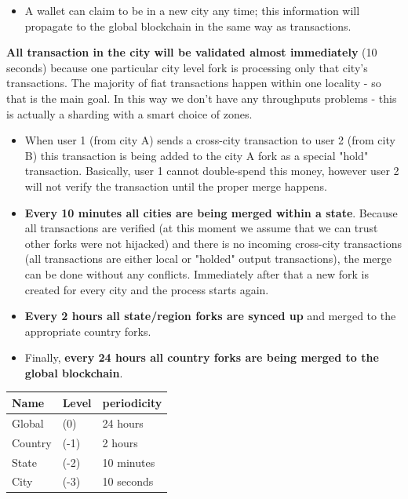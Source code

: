 \documentclass[portrait,ansidpaper,fontscale=0.445]{baposter} %
\begin{document}
\begin{poster}
{\begin{multicols}{2}
\begin{itemize}[leftmargin=1em]
    \item A wallet can claim to be in a new city any time; this information
        will propagate to the global blockchain in the same way as
        transactions.
\end{itemize}

\textbf{All transaction in the city will be validated almost immediately} (10 seconds)
because one particular city level fork is processing only that city's
transactions. The majority of fiat transactions happen within one locality - so
that is the main goal. In this way we don't have any throughputs problems -
this is actually a sharding with a smart choice of zones.

\begin{itemize}[leftmargin=1em]
    \item When user 1 (from city A) sends a cross-city transaction to user 2
        (from city B) this transaction is being added to the city A fork as a
        special "hold" transaction. Basically, user 1 cannot double-spend this
        money, however user 2 will not verify the transaction until the proper
        merge happens.

    \item \textbf{Every 10 minutes all cities are being merged within a state}. Because
        all transactions are verified (at this moment we assume that we can
        trust other forks were not hijacked) and there is no incoming cross-city
        transactions (all transactions are either local or "holded" output
        transactions), the merge can be done without any conflicts. Immediately
        after that a new fork is created for every city and the process starts
        again.

    \item \textbf{Every 2 hours all state/region forks are synced up} and merged
        to the appropriate country forks.

    \item Finally, \textbf{every 24 hours all country forks are being merged to the
    global blockchain}.

\end{itemize}

\vspace{-1.5em}
\begin{center}
\begin{tabular}{l l l}
\textbf{Name} & \textbf{Level} & \textbf{periodicity}  \\
\midrule
Global  & (0)  & 24 hours \\
Country & (-1) & 2 hours \\
State &   (-2) & 10 minutes \\
City  &   (-3) & 10 seconds \\
\end{tabular}
\end{center}


\end{multicols}}
\end{poster}
\end{document}
